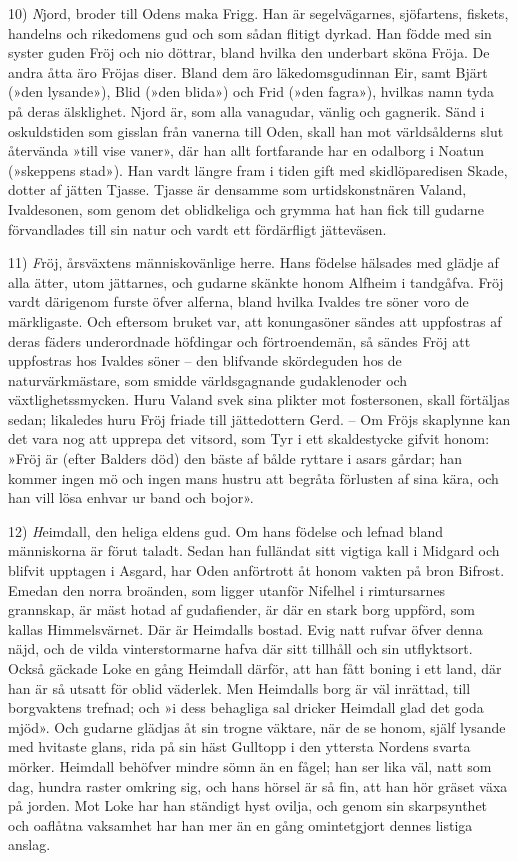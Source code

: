 10) {\emph Njord}, broder till Odens maka Frigg. Han är segelvägarnes,
sjöfartens, fiskets, handelns och rikedomens gud och som sådan flitigt
dyrkad. Han födde med sin syster guden Fröj och nio döttrar, bland
hvilka den underbart sköna Fröja. De andra åtta äro Fröjas diser. Bland
dem äro läkedomsgudinnan Eir, samt Bjärt (»den lysande»), Blid (»den
blida») och Frid (»den fagra»), hvilkas namn tyda på deras älsklighet.
Njord är, som alla vanagudar, vänlig och gagnerik. Sänd i oskuldstiden
som gisslan från vanerna till Oden, skall han mot världsålderns slut
återvända »till vise vaner», där han allt fortfarande har en odalborg i
Noatun (»skeppens stad»). Han vardt längre fram i tiden gift med
skidlöparedisen Skade, dotter af jätten Tjasse. Tjasse är densamme som
urtidskonstnären Valand, Ivaldesonen, som genom det oblidkeliga och
grymma hat han fick till gudarne förvandlades till sin natur och vardt
ett fördärfligt jätteväsen.

11) {\emph Fröj}, årsväxtens människovänlige herre. Hans födelse hälsades
med glädje af alla ätter, utom jättarnes, och gudarne skänkte honom
Alfheim i tandgåfva. Fröj vardt därigenom furste öfver alferna, bland
hvilka Ivaldes tre söner voro de märkligaste. Och eftersom bruket var,
att konungasöner sändes att uppfostras af deras fäders underordnade
höfdingar och förtroendemän, så sändes Fröj att uppfostras hos Ivaldes
söner -- den blifvande skördeguden hos de naturvärkmästare, som smidde
världsgagnande gudaklenoder och växtlighetssmycken. Huru Valand svek
sina plikter mot
fostersonen,
skall förtäljas sedan; likaledes huru Fröj friade till jättedottern
Gerd. -- Om Fröjs skaplynne kan det vara nog att upprepa det vitsord,
som Tyr i ett skaldestycke gifvit honom: »Fröj är (efter Balders död)
den bäste af bålde ryttare i asars gårdar; han kommer ingen mö och ingen
mans hustru att begråta förlusten af sina kära, och han vill lösa enhvar
ur band och bojor».

12) {\emph Heimdall}, den heliga eldens gud. Om hans födelse och lefnad
bland människorna är förut taladt. Sedan han fulländat sitt vigtiga kall
i Midgard och blifvit upptagen i Asgard, har Oden anförtrott åt honom
vakten på bron Bifrost. Emedan den norra broänden, som ligger utanför
Nifelhel i rimtursarnes grannskap, är mäst hotad af gudafiender, är där
en stark borg uppförd, som kallas Himmelsvärnet. Där är Heimdalls
bostad. Evig natt rufvar öfver denna näjd, och de vilda vinterstormarne
hafva där sitt tillhåll och sin utflyktsort. Också gäckade Loke en gång
Heimdall därför, att han fått boning i ett land, där han är så utsatt
för oblid väderlek. Men Heimdalls borg är väl inrättad, till borgvaktens
trefnad; och »i dess behagliga sal dricker Heimdall glad det goda mjöd».
Och gudarne glädjas åt sin trogne väktare, när de se honom, själf
lysande med hvitaste glans, rida på sin häst Gulltopp i den yttersta
Nordens svarta mörker. Heimdall behöfver mindre sömn än en fågel; han
ser lika väl, natt som dag, hundra raster omkring sig, och hans hörsel
är så fin, att han hör gräset växa på jorden. Mot Loke har han ständigt
hyst ovilja, och genom sin skarpsynthet och oaflåtna vaksamhet har han
mer än en gång omintetgjort dennes listiga anslag.

